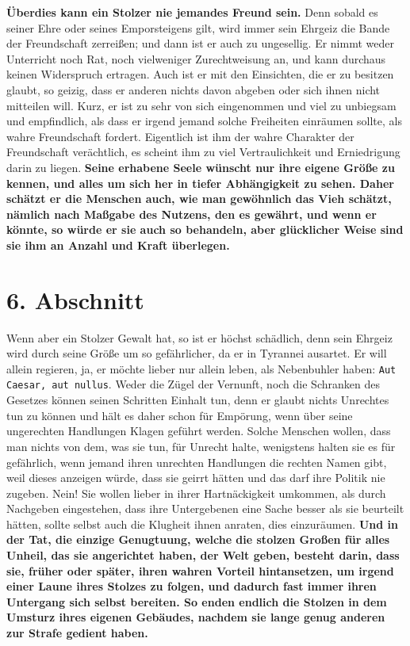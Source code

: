 \label{ref:12_05_eitle_menschen_freundschaft}
\textbf{Überdies kann ein Stolzer nie jemandes Freund sein.} Denn sobald es seiner
Ehre
oder seines Emporsteigens gilt, wird immer sein Ehrgeiz die Bande der Freundschaft
zerreißen; und dann ist er auch zu ungesellig. Er nimmt weder Unterricht noch
Rat, noch vielweniger Zurechtweisung an, und kann
durchaus keinen Widerspruch
ertragen. Auch ist er mit den Einsichten, die er zu besitzen glaubt, so geizig,
dass er anderen nichts davon abgeben oder sich ihnen nicht mitteilen will.
Kurz, er ist zu sehr von sich eingenommen und viel zu unbiegsam und empfindlich,
als dass er irgend jemand solche Freiheiten einräumen sollte, als wahre
Freundschaft fordert. Eigentlich ist ihm der wahre Charakter der Freundschaft
verächtlich, es scheint ihm zu viel Vertraulichkeit und Erniedrigung darin zu
liegen. \textbf{Seine erhabene Seele wünscht nur ihre eigene Größe zu kennen,
und alles
um sich her in tiefer Abhängigkeit zu sehen. Daher schätzt er die Menschen auch,
wie man gewöhnlich das Vieh schätzt, nämlich nach Maßgabe des Nutzens, den es
gewährt, und wenn er könnte, so würde er sie auch so behandeln, aber glücklicher
Weise sind sie ihm an Anzahl und Kraft überlegen.}

\section{6. Abschnitt} \label{kap12_ab6}

Wenn aber ein Stolzer Gewalt hat, so ist er höchst
schädlich, denn sein Ehrgeiz
wird durch seine Größe um so gefährlicher, da er in Tyrannei
ausartet. Er will
allein regieren, ja, er möchte lieber nur allein leben, als Nebenbuhler haben:
\texttt{Aut Caesar, aut nullus}. Weder die Zügel der Vernunft, noch die
Schranken des
Gesetzes können seinen Schritten Einhalt tun, denn er glaubt nichts Unrechtes
tun zu können und hält es daher schon für Empörung, wenn über seine ungerechten
Handlungen Klagen geführt werden. Solche Menschen wollen, dass man nichts von
dem, was sie tun, für Unrecht halte, wenigstens halten sie es für gefährlich,
wenn jemand ihren unrechten Handlungen die rechten Namen gibt, weil dieses
anzeigen würde, dass sie geirrt hätten und das darf ihre Politik nie zugeben.
Nein! Sie wollen lieber in ihrer Hartnäckigkeit umkommen, als durch Nachgeben
eingestehen, dass ihre Untergebenen eine Sache besser als sie beurteilt hätten,
sollte selbst auch die Klugheit ihnen anraten, dies einzuräumen.
\label{ref:12_06_eitle_menschen_sturz}
\textbf{Und in der
Tat, die einzige Genugtuung, welche die stolzen Großen für alles Unheil, das
sie angerichtet haben, der Welt geben, besteht darin, dass sie, früher oder
später, ihren wahren Vorteil hintansetzen, um irgend einer Laune ihres Stolzes
zu folgen, und dadurch fast immer ihren Untergang sich selbst bereiten. So enden
endlich die Stolzen in dem Umsturz ihres eigenen Gebäudes, nachdem sie lange
genug anderen zur Strafe gedient haben.}

